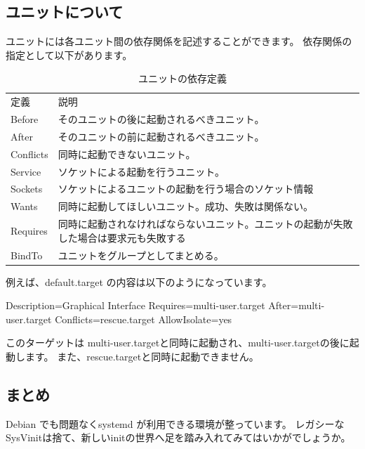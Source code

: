 \documentclass[mingoth,a4paper]{jsarticle}
\begin{document}
\subsection{ユニットについて}
ユニットには各ユニット間の依存関係を記述することができます。
依存関係の指定として以下があります。

\begin{table}[htb]
\begin{center}
  \begin{tabular}{ll}
    定義 & 説明 \\
    Before & そのユニットの後に起動されるべきユニット。 \\
    After & そのユニットの前に起動されるべきユニット。 \\
    Conflicts & 同時に起動できないユニット。 \\
    Service & ソケットによる起動を行うユニット。 \\
    Sockets & ソケットによるユニットの起動を行う場合のソケット情報 \\
    Wants  & 同時に起動してほしいユニット。成功、失敗は関係ない。\\
    Requires & 同時に起動されなければならないユニット。ユニットの起動が失敗した場合は要求元も失敗する \\
    BindTo & ユニットをグループとしてまとめる。
  \end{tabular}
\caption{ユニットの依存定義}
\label{tbl:unit-depends}
\end{center}
\end{table}

例えば、default.target の内容は以下のようになっています。
\begin{commandline}
[Unit]
Description=Graphical Interface
Requires=multi-user.target
After=multi-user.target
Conflicts=rescue.target
AllowIsolate=yes
\end{commandline}


このターゲットは
multi-user.targetと同時に起動され、multi-user.targetの後に起動します。
また、rescue.targetと同時に起動できません。

\subsection{まとめ}

Debian でも問題なくsystemd が利用できる環境が整っています。
レガシーなSysVinitは捨て、新しいinitの世界へ足を踏み入れてみてはいかがでしょうか。
\end{document}
